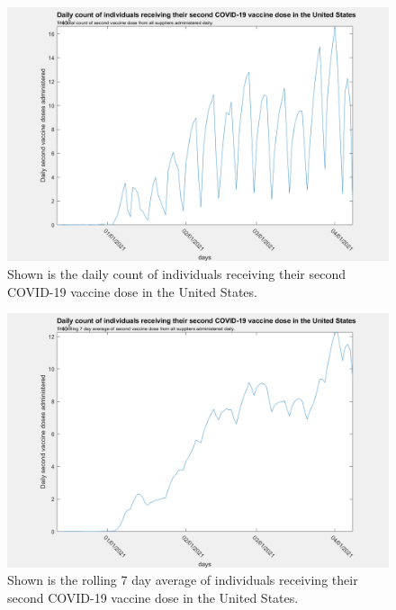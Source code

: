\documentclass[twoside]{article}
\begin{document}
\begin{multicols}{2}
\begin{figure}[H]
	\includegraphics[width=\linewidth]{images/usa_daily_second_doses_unprocessed.png}
	\caption{Shown is the daily count of individuals receiving their second COVID-19 vaccine dose in the United States.}
	\label{fig:images/usa_daily_second_doses_unprocessedLabel}
\end{figure}

\begin{figure}[H]
	\includegraphics[width=\linewidth]{images/usa_daily_second_doses_processed.png}
	\caption{Shown is the rolling 7 day average of individuals receiving their second COVID-19 vaccine dose in the United States.}
	\label{fig:images/usa_daily_second_doses_processedLabel}
\end{figure}


\end{multicols}
\end{document}
